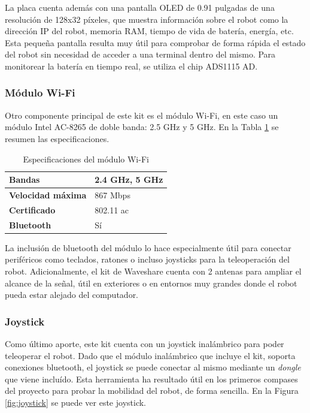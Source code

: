La placa cuenta además con una pantalla OLED de 0.91 pulgadas de una resolución de 128x32 píxeles, que muestra información sobre el robot como la dirección IP del robot, memoria RAM, tiempo de vida de batería, energía, etc. Esta pequeña pantalla resulta muy útil para comprobar de forma rápida el estado del robot sin necesidad de acceder a una terminal dentro del mismo. Para monitorear la batería en tiempo real, se utiliza el chip ADS1115 AD.

\subsubsection{Módulo Wi-Fi}

Otro componente principal de este kit es el módulo Wi-Fi, en este caso un módulo Intel AC-8265 de doble banda: 2.5 GHz y 5 GHz. En la Tabla \ref{tab:wifi} se resumen las especificaciones.

\begin{table}[H]
\centering
\captionsetup[table]{name=New Table Name}

\begin{tabular}{l|l} \hline
\textbf{Bandas} & 2.4 GHz, 5 GHz \\ \hline
\textbf{Velocidad máxima} & 867 Mbps \\ \hline
\textbf{Certificado} & 802.11 ac \\ \hline
\textbf{Bluetooth} & Sí \\ \hline
\end{tabular}
\caption{Especificaciones del módulo Wi-Fi}
\label{tab:wifi}
\end{table}

La inclusión de bluetooth del módulo lo hace especialmente útil para conectar periféricos como teclados, ratones o incluso joysticks para la teleoperación del robot. Adicionalmente, el kit de Waveshare cuenta con 2 antenas para ampliar el alcance de la señal, útil en exteriores o en entornos muy grandes donde el robot pueda estar alejado del computador.

\subsubsection{Joystick}

Como último aporte, este kit cuenta con un joystick inalámbrico para poder teleoperar el robot. Dado que el módulo inalámbrico que incluye el kit, soporta conexiones bluetooth, el joystick se puede conectar al mismo mediante un \textit{dongle} que viene incluído. Esta herramienta ha resultado útil en los primeros compases del proyecto para probar la mobilidad del robot, de forma sencilla. En la Figura \ref{fig:joystick} se puede ver este joystick.

